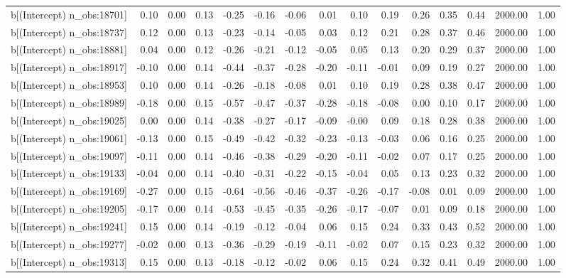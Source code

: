 \begin{table}[ht]
\begin{tabular}{rrrrrrrrrrrrrrr}
  b[(Intercept) n\_obs:18701] & 0.10 & 0.00 & 0.13 & -0.25 & -0.16 & -0.06 & 0.01 & 0.10 & 0.19 & 0.26 & 0.35 & 0.44 & 2000.00 & 1.00 \\ 
  b[(Intercept) n\_obs:18737] & 0.12 & 0.00 & 0.13 & -0.23 & -0.14 & -0.05 & 0.03 & 0.12 & 0.21 & 0.28 & 0.37 & 0.46 & 2000.00 & 1.00 \\ 
  b[(Intercept) n\_obs:18881] & 0.04 & 0.00 & 0.12 & -0.26 & -0.21 & -0.12 & -0.05 & 0.05 & 0.13 & 0.20 & 0.29 & 0.37 & 2000.00 & 1.00 \\ 
  b[(Intercept) n\_obs:18917] & -0.10 & 0.00 & 0.14 & -0.44 & -0.37 & -0.28 & -0.20 & -0.11 & -0.01 & 0.09 & 0.19 & 0.27 & 2000.00 & 1.00 \\ 
  b[(Intercept) n\_obs:18953] & 0.10 & 0.00 & 0.14 & -0.26 & -0.18 & -0.08 & 0.01 & 0.10 & 0.19 & 0.28 & 0.38 & 0.47 & 2000.00 & 1.00 \\ 
  b[(Intercept) n\_obs:18989] & -0.18 & 0.00 & 0.15 & -0.57 & -0.47 & -0.37 & -0.28 & -0.18 & -0.08 & 0.00 & 0.10 & 0.17 & 2000.00 & 1.00 \\ 
  b[(Intercept) n\_obs:19025] & 0.00 & 0.00 & 0.14 & -0.38 & -0.27 & -0.17 & -0.09 & -0.00 & 0.09 & 0.18 & 0.28 & 0.38 & 2000.00 & 1.00 \\ 
  b[(Intercept) n\_obs:19061] & -0.13 & 0.00 & 0.15 & -0.49 & -0.42 & -0.32 & -0.23 & -0.13 & -0.03 & 0.06 & 0.16 & 0.25 & 2000.00 & 1.00 \\ 
  b[(Intercept) n\_obs:19097] & -0.11 & 0.00 & 0.14 & -0.46 & -0.38 & -0.29 & -0.20 & -0.11 & -0.02 & 0.07 & 0.17 & 0.25 & 2000.00 & 1.00 \\ 
  b[(Intercept) n\_obs:19133] & -0.04 & 0.00 & 0.14 & -0.40 & -0.31 & -0.22 & -0.15 & -0.04 & 0.05 & 0.13 & 0.23 & 0.32 & 2000.00 & 1.00 \\ 
  b[(Intercept) n\_obs:19169] & -0.27 & 0.00 & 0.15 & -0.64 & -0.56 & -0.46 & -0.37 & -0.26 & -0.17 & -0.08 & 0.01 & 0.09 & 2000.00 & 1.00 \\ 
  b[(Intercept) n\_obs:19205] & -0.17 & 0.00 & 0.14 & -0.53 & -0.45 & -0.35 & -0.26 & -0.17 & -0.07 & 0.01 & 0.09 & 0.18 & 2000.00 & 1.00 \\ 
  b[(Intercept) n\_obs:19241] & 0.15 & 0.00 & 0.14 & -0.19 & -0.12 & -0.04 & 0.06 & 0.15 & 0.24 & 0.33 & 0.43 & 0.52 & 2000.00 & 1.00 \\ 
  b[(Intercept) n\_obs:19277] & -0.02 & 0.00 & 0.13 & -0.36 & -0.29 & -0.19 & -0.11 & -0.02 & 0.07 & 0.15 & 0.23 & 0.32 & 2000.00 & 1.00 \\ 
  b[(Intercept) n\_obs:19313] & 0.15 & 0.00 & 0.13 & -0.18 & -0.12 & -0.02 & 0.06 & 0.15 & 0.24 & 0.32 & 0.41 & 0.49 & 2000.00 & 1.00 \\ 

\end{tabular}
\end{table}
